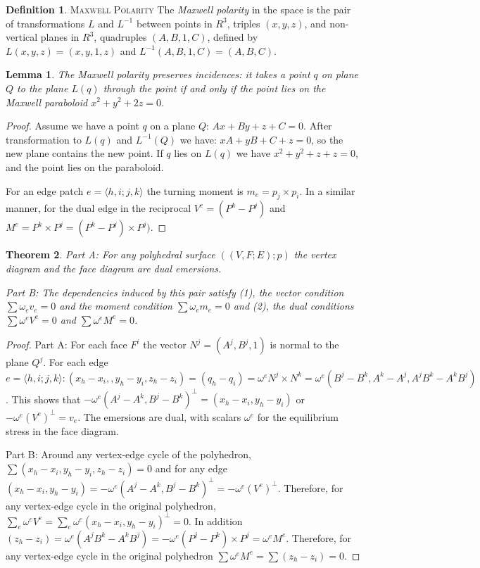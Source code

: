 \documentclass[11pt]{article}
\newtheorem{theorem}{Theorem}[section]
\newtheorem{lemma}[theorem]{Lemma}
\theoremstyle{definition}
\newtheorem{definition}{Definition}[section]
\begin{document}
	\theoremstyle{definition}
 	\begin{definition}{\textsc{Maxwell Polarity}}
 		The \emph{Maxwell polarity} in the space is the pair of transformations $L$ and $L^{-1}$ between points in $R^3$, triples $(x,y,z)$, and non-vertical planes in $R^3$, quadruples $(A,B,1,C)$, defined by $L(x,y,z)=(x,y,1,z)$ and $L^{-1}(A,B,1,C) = (A,B,C)$.
 	\end{definition}
	
	\begin{lemma}
		The Maxwell polarity preserves incidences: it takes a point $q$ on plane $Q$ to the plane $L(q)$ through the point if and only if the point lies on the Maxwell paraboloid $x^2 + y^2 + 2z = 0$.
 	\end{lemma}
	
	\begin{proof}
		Assume we have a point $q$ on a plane $Q$: $Ax + By + z + C = 0$. 
		After transformation to $L(q)$ and $L^{-1}(Q)$ we have: $xA + yB + C + z = 0$, so the new plane contains the new point. 
		If $q$ lies on $L(q)$ we have $x^2 + y^2 + z + z = 0$, and the point lies on the paraboloid. 
 
 		For an edge patch $e = \langle h,i;j,k \rangle$ the turning moment is $m_e = p_j \times p_i$. 
		In a similar manner, for the dual edge in the reciprocal $V^e = (P^k - P^j)$ and $M^e = P^k \times P^j = (P^k - P^j)\times P^j)$.
	\end{proof}
 
	\begin{theorem}
		Part A: For any polyhedral surface $((V,F;E);p)$ the vertex diagram and the face diagram are dual emersions.
		
 		Part B: The dependencies induced by this pair satisfy 
		(1), the vector condition $\sum \omega_e v_e = 0$ and the moment condition $\sum \omega_e m_e = 0$ and 
		(2), the dual conditions $\sum \omega^e V^e = 0$ and $\sum \omega^e M^e = 0$.
	\end{theorem}
 
 	\begin{proof}
		Part A: 
		For each face $F^i$ the vector $N^j = (A^j, B^j,1)$ is normal to the plane $Q^j$. 
		For each edge $e = \langle h,i;j,k \rangle:  (x_h-x_i,,y_h-y_i, z_h-z_i)=(q_h-q_i) = \omega^e N^j \times N^k = \omega^e(B^j-B^k,A^k-A^j,A^jB^k-A^kB^j)$. 
		This shows that $-\omega^e(A^j-A^k,B^j-B^k)^\bot = (x_h - x_i, y_h-y_i)$ or $-\omega^e(V^e)^\bot = v_e$. 
		The emersions are dual, with scalars $\omega^e$ for the equilibrium stress in the face diagram.
 
 		Part B: 
		Around any vertex-edge cycle of the polyhedron, $\sum(x_h - x_i, y_h-y_i, z_h-z_i) = 0$ and for any edge $(x_h-x_i,y_h-y_i) = -\omega^e(A^j-A^k,B^j-B^k)^\bot = -\omega^e(V^e)^\bot$. 
		Therefore, for any vertex-edge cycle in the original polyhedron, $\sum_e \omega^eV^e = \sum_e \omega^e(x_h-x_i,y_h-y_i)^\bot = 0$. 
		In addition $(z_h-z_i) = \omega^e(A^jB^k-A^kB^j) = -\omega^e(P^j-P^k) \times P^j = \omega^eM^e$. 
		Therefore, for any vertex-edge cycle in the original polyhedron $\sum \omega^eM^e = \sum(z_h-z_i) = 0$. 
 	\end{proof}
	
\end{document}

